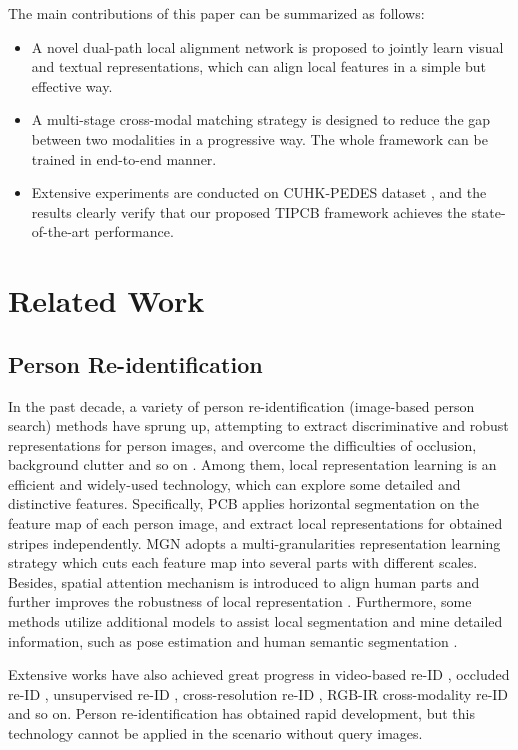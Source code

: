 \documentclass[review]{elsarticle}
\begin{document}
The main contributions of this paper can be summarized as follows:
\begin{itemize}
\item	A novel dual-path local alignment network is proposed to jointly learn visual and textual representations, which can align local features in a simple but effective way.
\item	A multi-stage cross-modal matching strategy is designed to reduce the gap between two modalities in a progressive way. The whole framework can be trained in end-to-end manner.
\item	Extensive experiments are conducted on CUHK-PEDES dataset \cite{7}, and the results clearly verify that our proposed TIPCB framework achieves the state-of-the-art performance.
\end{itemize}

\section{Related Work}
\subsection{Person Re-identification}
In the past decade, a variety of person re-identification (image-based person search) methods have sprung up, attempting to extract discriminative and robust representations for person images, and overcome the difficulties of occlusion, background clutter and so on \cite{27, 28}. Among them, local representation learning is an efficient and widely-used technology, which can explore some detailed and distinctive features. Specifically, PCB \cite{2} applies horizontal segmentation on the feature map of each person image, and extract local representations for obtained stripes independently. MGN \cite{29} adopts a multi-granularities representation learning strategy which cuts each feature map into several parts with different scales. Besides, spatial attention mechanism is introduced to align human parts and further improves the robustness of local representation \cite{30}. Furthermore, some methods utilize additional models to assist local segmentation and mine detailed information, such as pose estimation \cite{31, 32} and human semantic segmentation \cite{33}. 

Extensive works have also achieved great progress in video-based re-ID \cite{34, 35, 36}, occluded re-ID \cite{37}, unsupervised re-ID \cite{38, 39, 40}, cross-resolution re-ID \cite{41, 42, 43}, RGB-IR cross-modality re-ID \cite{44, 45, 46} and so on. Person re-identification has obtained rapid development, but this technology cannot be applied in the scenario without query images.
\end{document}
